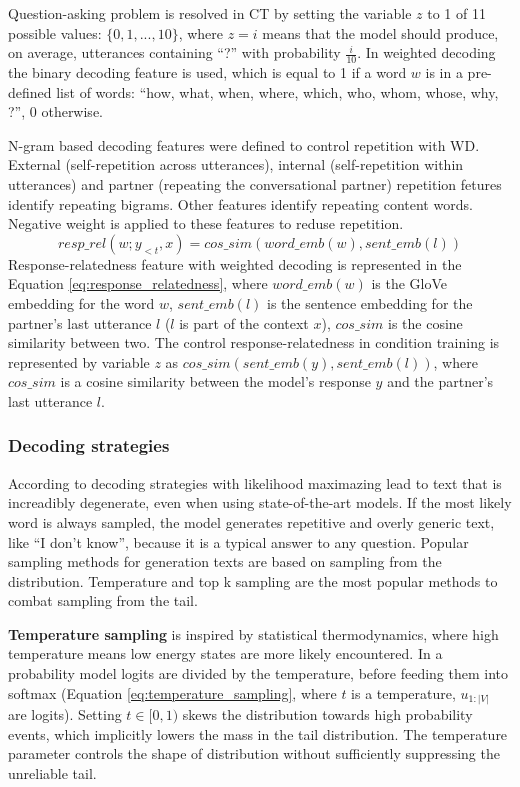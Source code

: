 Question-asking problem is resolved in CT by setting the variable $z$ to 1 of 11 possible values: $\{0, 1, ..., 10\}$, where $z=i$ means that the model should produce, on average, utterances containing ``?'' with probability $\frac{i}{10}$. In weighted decoding the binary decoding feature is used, which is equal to 1 if a word $w$ is in a pre-defined list of words: ``how, what, when, where, which, who, whom, whose, why, ?'', 0 otherwise.

N-gram based decoding features were defined to control repetition with WD. External (self-repetition across utterances), internal (self-repetition within utterances) and partner (repeating the conversational partner) repetition fetures identify repeating bigrams. Other features identify repeating content words. Negative weight is applied to these features to reduse repetition. 
\begin{equation} \label{eq:response_relatedness}
resp\_rel(w; y_{<t}, x) = cos\_sim(word\_emb(w), sent\_emb(l)) 
\end{equation}
Response-relatedness feature with weighted decoding is represented in the Equation \ref{eq:response_relatedness}, where $word\_emb(w)$ is the GloVe embedding for the word $w$, $sent\_emb(l)$ is the sentence embedding for the partner's last utterance $l$ ($l$ is part of the context $x$), $cos\_sim$ is the cosine similarity between two.
The control response-relatedness in condition training is represented by variable $z$ as $cos\_sim(sent\_emb(y), sent\_emb(l))$, where $cos\_sim$ is a cosine similarity between the model's response $y$ and the partner's last utterance $l$.

\subsubsection{Decoding strategies}
According to \cite{holtzman2019curious} decoding strategies with likelihood maximazing lead to text that is increadibly degenerate, even when using state-of-the-art models. If the most likely word is always sampled, the model generates repetitive and overly generic text, like ``I don't know'', because it is a typical answer to any question. Popular sampling methods for generation texts are based on sampling from the distribution. Temperature and top k sampling are the most popular methods to combat sampling from the tail.

\textbf{Temperature sampling} is inspired by statistical thermodynamics, where high temperature means low energy states are more likely encountered. In a probability model logits are divided by the temperature, before feeding them into softmax (Equation \ref{eq:temperature_sampling}, where $t$ is a temperature, $u_{1:|V|}$ are logits). Setting $t \in [0,1)$ skews the distribution towards high probability events, which implicitly lowers the mass in the tail distribution. The temperature parameter controls the shape of distribution without sufficiently suppressing the unreliable tail.

